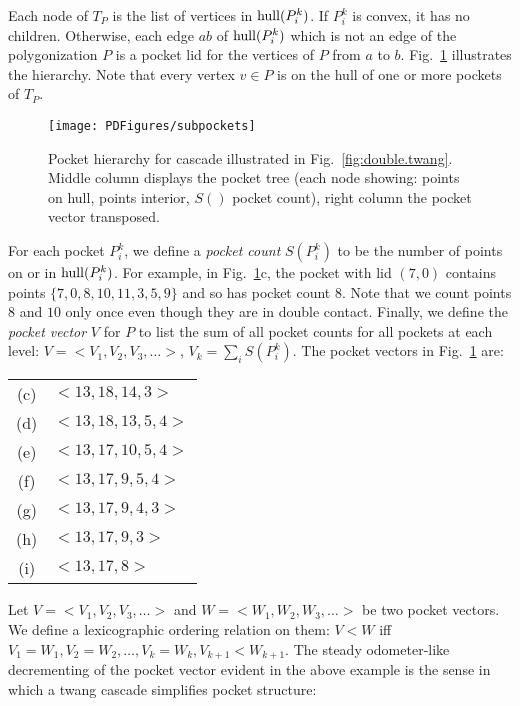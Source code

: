 \pdfoutput=1  \documentclass{article}
\def\hull{\mathop{\rm hull}\nolimits}
\newcommand{\figlab}[1]{\label{fig:#1}}
\newcommand{\figref}[1]{\ref{fig:#1}}
\begin{document}
Each node of $T_P$
is the list of vertices in $\hull(P^k_i)$.
If $P^k_i$ is convex, it has no children.
Otherwise, each edge $ab$ of $\hull(P^k_i)$
which is not an edge of the polygonization $P$ is
a pocket lid for the vertices of $P$ from $a$ to $b$.
Fig.~\figref{subpockets} illustrates the hierarchy.
Note that every vertex $v \in P$ is on the hull of one
or more pockets of $T_P$.
\begin{figure}[htbp]
\centering
\texttt{[image: PDFigures/subpockets]}
\caption{Pocket hierarchy for cascade illustrated
in Fig.~\protect\figref{double.twang}.
Middle column displays the pocket tree
(each node showing:
points on hull, points interior, $S()$ pocket count), 
right column the pocket vector transposed.}
\figlab{subpockets}
\end{figure}


For each pocket 
$P^k_i$,
we define a \emph{pocket count} $S(P^k_i)$
to be the number of points on or in
$\hull(P^k_i)$.
For example, in 
Fig.~\figref{subpockets}c,
the pocket with lid $(7,0)$ contains points
$\{7,0,8,10,11,3,5,9\}$ and so has pocket count $8$.
Note that we count points $8$ and $10$ only once even though
they are in double contact.
Finally, we define the \emph{pocket vector} $V$ for
$P$ to list the sum of all pocket counts for
all pockets at each level:
$V= {<} V_1,V_2,V_3, \ldots {>}$,
$V_{k} = \sum_i  S(P^k_i)$.
The pocket vectors in Fig.~\figref{subpockets} are:

\begin{center}
\begin{tabular}{|c|l|}
\hline
(c)  &   ${<} 13,18,14,3 {>}$ \\
(d)  &   ${<} 13,18,13,5,4 {>}$ \\
(e)  &   ${<} 13,17,10,5,4 {>}$ \\
(f)  &   ${<} 13,17, 9,5,4 {>}$ \\
(g)  &   ${<} 13,17, 9,4,3 {>}$ \\
(h)  &   ${<} 13,17, 9,3 {>}$ \\
(i)  &   ${<} 13,17, 8 {>}$ \\
\hline
\end{tabular}
\end{center}

Let $V= {<} V_1,V_2,V_3, \ldots {>}$ and $W={<}W_1,W_2,W_3, \ldots {>}$ be two pocket vectors.
We define a lexicographic ordering relation on them:
$V < W$
iff
$V_1=W_1, V_2=W_2, \ldots, V_k=W_k, V_{k+1} < W_{k+1}$.
The steady odometer-like decrementing of the pocket vector
evident in the above example
is the sense in which a twang cascade simplifies pocket structure:
\end{document}
